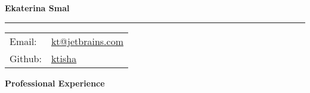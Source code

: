 \documentclass[letterpaper,11pt,oneside]{article}
\begin{document}
\noindent  \LARGE{\textbf{Ekaterina Smal}}  \\
\vspace{-2ex}
{\color{gray}\hrule}

\vspace{2ex}
\normalsize

\noindent \begin{tabular}{@{} l l}
Email:        &  \href{mailto:kt@jetbrains.com }{kt@jetbrains.com }\\
Github:       &  \href{https://github.com/ktisha}{ktisha } \\

\end{tabular}

\vspace{1em}

\noindent \textbf{Professional Experience}

\vspace{1em}
\end{document}
